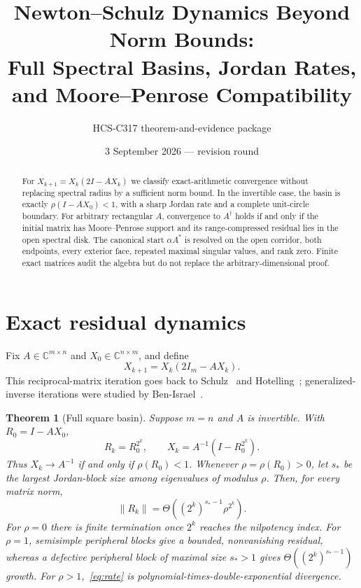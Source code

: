 \documentclass[9pt]{extarticle}
\title{Newton--Schulz Dynamics Beyond Norm Bounds:\\Full Spectral Basins, Jordan Rates, and Moore--Penrose Compatibility}
\author{HCS-C317 theorem-and-evidence package}
\date{3 September 2026 --- revision round \CRevisionRound}
\newtheorem{theorem}{Theorem}
\newcommand{\CC}{\mathbb C}
\begin{document}
\maketitle
\begin{abstract}
For $X_{k+1}=X_k(2I-AX_k)$ we classify exact-arithmetic convergence without replacing spectral radius by a sufficient norm bound.  In the invertible case, the basin is exactly $\rho(I-AX_0)<1$, with a sharp Jordan rate and a complete unit-circle boundary.  For arbitrary rectangular $A$, convergence to $A^\dagger$ holds if and only if the initial matrix has Moore--Penrose support and its range-compressed residual lies in the open spectral disk.  The canonical start $\alpha A^*$ is resolved on the open corridor, both endpoints, every exterior face, repeated maximal singular values, and rank zero.  Finite exact matrices audit the algebra but do not replace the arbitrary-dimensional proof.
\end{abstract}

\section{Exact residual dynamics}
Fix $A\in\CC^{m\times n}$ and $X_0\in\CC^{n\times m}$, and define
\begin{equation}\label{eq:iteration}
 X_{k+1}=X_k(2I_m-AX_k).
\end{equation}
This reciprocal-matrix iteration goes back to Schulz~\cite{schulz} and
Hotelling~\cite{hotelling}; generalized-inverse iterations were studied by
Ben-Israel~\cite{benisrael}.

\begin{theorem}[Full square basin]\label{thm:square}
Suppose $m=n$ and $A$ is invertible.  With $R_0=I-AX_0$,
\begin{equation}\label{eq:squarepower}
 R_k=R_0^{2^k},\qquad
 X_k=A^{-1}(I-R_0^{2^k}).
\end{equation}
Thus $X_k\to A^{-1}$ if and only if $\rho(R_0)<1$.  Whenever
$\rho=\rho(R_0)>0$, let $s_*$ be the largest Jordan-block size among
eigenvalues of modulus $\rho$.  Then, for every matrix norm,
\begin{equation}\label{eq:rate}
 \lVert R_k\rVert=\Theta\!\left((2^k)^{s_*-1}\rho^{2^k}\right).
\end{equation}
For $\rho=0$ there is finite termination once $2^k$ reaches the
nilpotency index.  For $\rho=1$, semisimple peripheral blocks give a
bounded, nonvanishing residual, whereas a defective peripheral block of
maximal size $s_*>1$ gives $\Theta((2^k)^{s_*-1})$ growth.  For
$\rho>1$,~\eqref{eq:rate} is polynomial-times-double-exponential
divergence.
\end{theorem}
\end{document}
